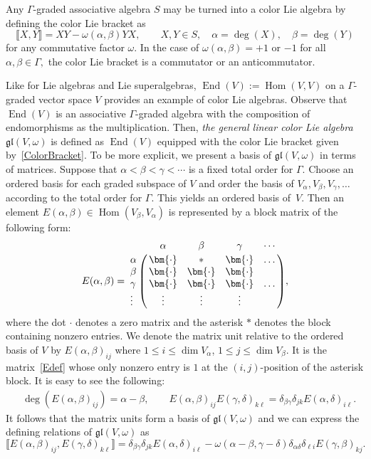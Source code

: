 \documentclass[10pt,a4paper]{amsart}
\numberwithin{equation}{section}
\theoremstyle{definition}
\def\gl{\mathfrak{gl}}
\begin{document}
Any $\Gamma$-graded associative algebra $ S$ may be turned into a color Lie algebra by defining the color Lie bracket as
\begin{equation}
	\llbracket X, Y \rrbracket = XY - \omega(\alpha,\beta) YX, \qquad
	X, Y \in S, \quad \alpha = \deg(X),\quad \beta = \deg(Y)
	\label{ColorBracket}
\end{equation}
for any commutative factor $\omega.$
In the case of $ \omega(\alpha,\beta) = +1 $ or $ -1$ for all $\alpha, \beta \in \Gamma, $ the color Lie bracket is a commutator or an anticommutator.

Like for Lie algebras and Lie superalgebras, $ \operatorname{End}(V) := \operatorname{Hom}(V,V)$ on a $\Gamma$-graded vector space $V$ provides an example of color Lie algebras.
Observe that $\operatorname{End}(V)$ is an associative $\Gamma$\nobreakdash-graded algebra with the composition of endomorphisms as the multiplication.
Then, \textit{the general linear color Lie algebra} $ \gl(V,\omega)$ is defined as $\operatorname{End}(V)$ equipped with the color Lie bracket given by~\eqref{ColorBracket}.
To be more explicit, we present a basis of $\gl(V,\omega)$ in terms of matrices.
Suppose that $ \alpha < \beta < \gamma < \cdots $ is a fixed total order for $\Gamma.$
Choose an ordered basis for each graded subspace of $V$ and order the basis of $ V_{\alpha}, V_{\beta}, V_{\gamma}, \dots $ according to the total order for $\Gamma.$
This yields an ordered basis of~$V$.
Then an element $E(\alpha,\beta) \in \operatorname{Hom}(V_{\beta}, V_{\alpha})$ is represented by a block matrix of the following form:
\begin{equation}
	E(\alpha,\beta)=
	\bordermatrix{ & \alpha & \beta & \gamma & \cdots \cr
		\alpha & \bm{\cdot} & \ast & \bm{\cdot} & \ldots \cr
		\beta & \bm{\cdot} & \bm{\cdot} & \bm{\cdot} \cr
		\gamma & \bm{\cdot} & \bm{\cdot} & \bm{\cdot} & \ldots \cr
		\vdots & \vdots & \vdots & \vdots & \cr
	},
	\label{Edef}
\end{equation}
where the dot $\bm{\cdot}$ denotes a zero matrix and the asterisk $\ast$ denotes the block containing nonzero entries.
We denote the matrix unit relative to the ordered basis of $V$ by $ E(\alpha,\beta)_{ij} $ where $ 1 \leq i \leq \dim V_{\alpha}$, $1 \leq j \leq \dim V_{\beta}$. It is the matrix~\eqref{Edef} whose only nonzero entry is $1$ at the $(i,j)$-position of the asterisk block.
It is easy to see the following:
\begin{align*}
	&\deg(E(\alpha,\beta)_{ij})= \alpha - \beta,
	\qquad
	E(\alpha,\beta)_{ij} E(\gamma,\delta)_{k\ell}= \delta_{\beta\gamma} \delta_{jk} E(\alpha,\delta)_{i\ell}.
\end{align*}
It follows that the matrix units form a basis of $\gl(V,\omega)$ and we can express the defining relations of $\gl(V,\omega)$ as
\begin{equation*}
	\llbracket E(\alpha,\beta)_{ij}, E(\gamma,\delta)_{k\ell} \rrbracket =
	\delta_{\beta\gamma} \delta_{jk} E(\alpha,\delta)_{i\ell} - \omega(\alpha-\beta,\gamma-\delta) \delta_{\alpha\delta} \delta_{\ell i} E(\gamma,\beta)_{kj}.
\end{equation*}
\end{document}
